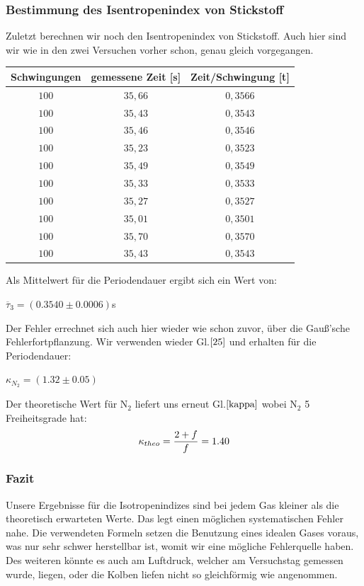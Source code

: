 \documentclass{article}
\begin{document}
{{\subsubsection{Bestimmung des Isentropenindex von Stickstoff}
Zuletzt berechnen wir noch den Isentropenindex von Stickstoff. Auch hier sind wir wie in den zwei Versuchen vorher schon, genau gleich vorgegangen.
\newpage
\begin{center}
\begin{tabular}{c|c|c}
Schwingungen & gemessene Zeit [s]& Zeit/Schwingung [t]\\
\hline 
\(100\)	& \(35,66\)	& \(0,3566\)\\
\(100\)	& \(35,43\)	& \(0,3543\)\\
\(100\)	& \(35,46\)	& \(0,3546\)\\
\(100\)	& \(35,23\)	& \(0,3523\)\\
\(100\)	& \(35,49\)	& \(0,3549\)\\
\(100\)	& \(35,33\)	& \(0,3533\)\\
\(100\)	& \(35,27\)	& \(0,3527\)\\
\(100\)	& \(35,01\)	& \(0,3501\)\\
\(100\)	& \(35,70\)	& \(0,3570\)\\
\(100\)	& \(35,43\)	& \(0,3543\)\\
\end{tabular}
\end{center}

\vspace{1cm}
Als Mittelwert für die Periodendauer ergibt sich ein Wert von:
\begin{center}
\(\overline{\tau}_{3} = (0.3540 \pm 0.0006)\)s
\end{center}

Der Fehler errechnet sich auch hier wieder wie schon zuvor, über die Gauß'sche Fehlerfortpflanzung.
Wir verwenden wieder Gl.\(\eqref{25}\) und erhalten für die Periodendauer:
\begin{center}
\(\kappa_{N_2} = (1.32 \pm 0.05)\)
\end{center}

Der theoretische Wert für N\(_2\) liefert uns erneut Gl.\(\eqref{kappa}\) wobei N\(_2\) 5 Freiheitsgrade hat:
\begin{equation}
\notag
\kappa_{theo} = \frac{2+f}{f} = 1.40
\end{equation}

\subsubsection{Fazit}
Unsere Ergebnisse für die Isotropenindizes sind bei jedem Gas kleiner als die theoretisch erwarteten Werte. Das legt einen möglichen systematischen Fehler nahe. Die verwendeten Formeln setzen die Benutzung eines idealen Gases voraus, was nur sehr schwer herstellbar ist, womit wir eine mögliche Fehlerquelle haben. Des weiteren könnte es auch am Luftdruck, welcher am Versuchstag gemessen wurde, liegen, oder die Kolben liefen nicht so gleichförmig wie angenommen.

}}
\end{document}
